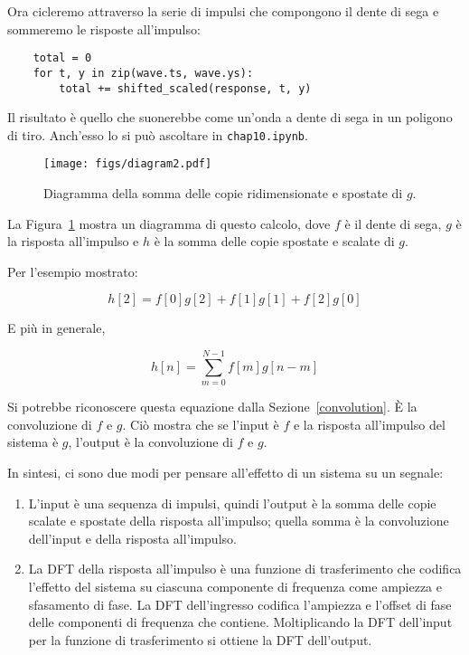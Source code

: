 \documentclass[12pt,a4paper]{book}
\begin{document}
Ora cicleremo attraverso la serie di impulsi che compongono il dente di sega e sommeremo le risposte all'impulso:

\begin{verbatim} 
    total = 0
    for t, y in zip(wave.ts, wave.ys):
        total += shifted_scaled(response, t, y)
 \end{verbatim} 

Il risultato è quello che suonerebbe come un'onda a dente di sega in un poligono di tiro. Anch'esso lo si può ascoltare in {\tt chap10.ipynb}.

\begin{figure} \centerline{\texttt{[image: figs/diagram2.pdf]}} \caption{Diagramma della somma delle copie ridimensionate e spostate di $g$.} \label{fig.convolution} \end{figure} 

La Figura~\ref{fig.convolution} mostra un diagramma di questo calcolo, dove $f$ è il dente di sega, $g$ è la risposta all'impulso e $h$ è la somma delle copie spostate e scalate di $g$.

Per l'esempio mostrato:

\[ h[2] = f[0]g[2] + f[1]g[1] + f[2]g[0] \] 

E più in generale,

\[ h[n] = \sum_{m=0}^{N-1} f[m] g[n-m] \] 

Si potrebbe riconoscere questa equazione dalla Sezione~\ref{convolution}. È la convoluzione di $f$ e $g$. Ciò mostra che se l'input è $f$ e la risposta all'impulso del sistema è $g$, l'output è la convoluzione di $f$ e $g$.

In sintesi, ci sono due modi per pensare all'effetto di un sistema su un segnale:

\begin{enumerate} 

\item L'input è una sequenza di impulsi, quindi l'output è la somma delle copie scalate e spostate della risposta all'impulso; quella somma è la convoluzione dell'input e della risposta all'impulso.

\item La DFT della risposta all'impulso è una funzione di trasferimento che codifica l'effetto del sistema su ciascuna componente di frequenza come ampiezza e sfasamento di fase. La DFT dell'ingresso codifica l'ampiezza e l'offset di fase delle componenti di frequenza che contiene. Moltiplicando la DFT dell'input per la funzione di trasferimento si ottiene la DFT dell'output.

\end{enumerate} 
\end{document}
